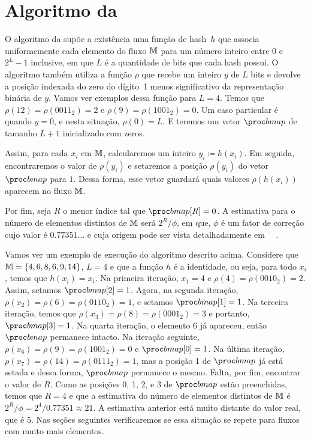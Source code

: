 \section{Algoritmo da }
\label{sec:flajolet-martin:algorithm}

O algoritmo da  supõe a existência uma função de hash~$h$ que associa uniformemente cada 
elemento do fluxo $\mathbb{M}$ para um número inteiro entre $0$ e $2^L-1$ inclusive, em que $L$ é a quantidade de bits que 
cada hash possui. O algoritmo também utiliza a função $\rho$ que recebe um inteiro $y$ de $L$ bits e devolve a posição 
indexada do zero do dígito~1 menos significativo da representação binária de $y$. Vamos ver exemplos dessa função para 
$L = 4$. Temos que $\rho(12) = \rho(0011_2) = 2$ e $\rho(9) = \rho(1001_2) = 0$. Um caso particular é quando $y = 0$, e 
nesta situação, $\rho(0) = L$. E teremos um vetor $\bitmap$ de tamanho $L + 1$ inicializado com zeros.

Assim, para cada $x_i$ em $\mathbb{M}$, calcularemos um inteiro $y_i \coloneqq h(x_i)$. Em seguida, encontraremos o valor de 
$\rho(y_i)$ e setaremos a posição $\rho(y_i)$ do vetor $\bitmap$ para $1$. Dessa forma, esse vetor guardará quais valores 
$\rho(h(x_i))$ aparecem no fluxo $\mathbb{M}$.

Por fim, seja $R$ o menor índice tal que $\bitmap[R] = 0$. A estimativa para o número de elementos distintos de 
$\mathbb{M}$ será $2^R/\phi$, em que, $\phi$ é um fator de correção cujo valor é $0.77351{\dots}$ e cuja origem pode ser vista
detalhadamente em ~~\citep{flajolet:martin:85}.

Vamos ver um exemplo de execução do algoritmo descrito acima. Considere que $\mathbb{M} = \{ 4, 6, 8, 6, 9, 14 \}$, $L = 4$ e
que a função $h$ é a identidade, ou seja, para todo $x_i$, temos que $h(x_i) = x_i$. Na primeira iteração, $x_1 = 4$ e 
$\rho(4) = \rho(0010_2) = 2$. Assim, setamos $\bitmap[2] = 1$. Agora, na segunda iteração, 
$\rho(x_2) = \rho(6) = \rho(0110_2) = 1$, e setamos $\bitmap[1] = 1$. Na terceira iteração, temos que 
$\rho(x_3) = \rho(8) = \rho(0001_2) = 3$ e portanto, $\bitmap[3] = 1$. Na quarta iteração, o elemento $6$ já apareceu, 
então $\bitmap$ permanece intacto. Na iteração seguinte, $\rho(x_6) = \rho(9) = \rho(1001_2) = 0$ e $\bitmap[0] = 1$.
Na última iteração, $\rho(x_7) = \rho(14) = \rho(0111_2) = 1$, mas a posição 1 de $\bitmap$ já está setada e dessa forma,
$\bitmap$ permanece o mesmo. Falta, por fim, encontrar o valor de $R$. Como as posições 0, 1, 2, e 3 de $\bitmap$ estão
preenchidas, temos que $R = 4$ e que a estimativa do número de elementos distintos de $\mathbb{M}$ é 
$2^{R}/\phi = 2^4/0.77351 \approx 21$. A estimativa anterior está muito distante do valor real, que é $5$. Nas seções
seguintes verificaremos se essa situação se repete para fluxos com muito mais elementos.

